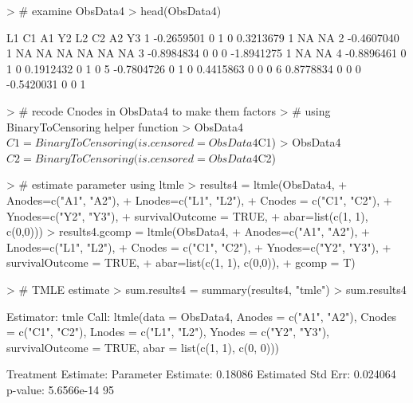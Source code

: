 \documentclass{exam}
\begin{document}
\begin{solution}
\begin{Schunk}
\begin{Sinput}
> # examine ObsData4
> head(ObsData4)
\end{Sinput}
\begin{Soutput}
          L1 C1 A1 Y2         L2 C2 A2 Y3
1 -0.2659501  0  1  0  0.3213679  1 NA NA
2 -0.4607040  1 NA NA         NA NA NA NA
3 -0.8984834  0  0  0 -1.8941275  1 NA NA
4 -0.8896461  0  1  0  0.1912432  0  1  0
5 -0.7804726  0  1  0  0.4415863  0  0  0
6  0.8778834  0  0  0 -0.5420031  0  0  1
\end{Soutput}
\end{Schunk}
\begin{Schunk}
\begin{Sinput}
> # recode Cnodes in ObsData4 to make them factors 
> # using BinaryToCensoring helper function
> ObsData4$C1 = BinaryToCensoring(is.censored = ObsData4$C1)
> ObsData4$C2 = BinaryToCensoring(is.censored = ObsData4$C2)
\end{Sinput}
\end{Schunk}
\begin{Schunk}
\begin{Sinput}
> # estimate parameter using ltmle
> results4 = ltmle(ObsData4, 
+                  Anodes=c("A1", "A2"), 
+                  Lnodes=c("L1", "L2"), 
+                  Cnodes = c("C1", "C2"),
+                  Ynodes=c("Y2", "Y3"),
+                  survivalOutcome = TRUE,
+                  abar=list(c(1, 1), c(0,0)))
> results4.gcomp = ltmle(ObsData4,
+                        Anodes=c("A1", "A2"),
+                        Lnodes=c("L1", "L2"),
+                        Cnodes = c("C1", "C2"),
+                        Ynodes=c("Y2", "Y3"),
+                        survivalOutcome = TRUE,
+                        abar=list(c(1, 1), c(0,0)),
+                        gcomp = T)
\end{Sinput}
\end{Schunk}
\begin{Schunk}
\begin{Sinput}
> # TMLE estimate
> sum.results4 = summary(results4, "tmle")
> sum.results4
\end{Sinput}
\begin{Soutput}
Estimator:  tmle 
Call:
ltmle(data = ObsData4, Anodes = c("A1", "A2"), Cnodes = c("C1", 
    "C2"), Lnodes = c("L1", "L2"), Ynodes = c("Y2", "Y3"), survivalOutcome = TRUE, 
    abar = list(c(1, 1), c(0, 0)))

Treatment Estimate:
   Parameter Estimate:  0.18086 
    Estimated Std Err:  0.024064 
              p-value:  5.6566e-14 
    95%


\end{Soutput}
\end{Schunk}
\end{solution}
\end{document}
